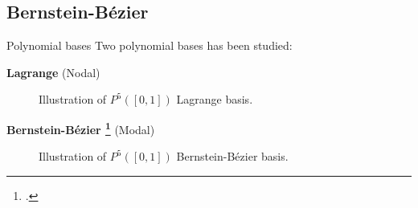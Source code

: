 
\subsection{Bernstein-Bézier}
 \begin{frame}{Polynomial bases}
 \scriptsize
 Two polynomial bases has been studied:
 \begin{multicols}{2}
 \textbf{Lagrange} (Nodal)

\vspace{0.5cm}
\begin{figure}[H]
\centering
\setlength{\plotwidth}{3.5cm}
\setlength{\plotheight}{2.5cm}

\caption*{\scriptsize{Illustration of $P^5([0,1])$ Lagrange basis.}}
\label{lagrange_5}
\end{figure}

\columnbreak
\textbf{Bernstein-Bézier \footcite{chanGPUacceleratedBernsteinBezierDiscontinuous2016}} (Modal)

\begin{figure}[H]
\centering
\setlength{\plotwidth}{3.5cm}
\setlength{\plotheight}{2.5cm}

\caption*{\scriptsize{Illustration of $P^5([0,1])$ Bernstein-Bézier basis.}}
\label{bb_base_5}
\end{figure}

\end{multicols}

\end{frame}




